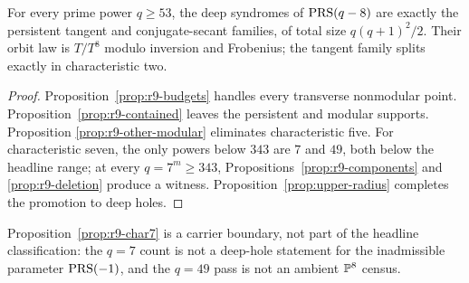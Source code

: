 \begin{theorem}\label{thm:r9}%
%
%
%
%
For every prime power $q\geq53$, the
deep syndromes of $\operatorname{PRS}(q-8)$ are
exactly the persistent tangent and conjugate-secant families, of total
size $q(q+1)^2/2$.  Their orbit law is $T/T^8$ modulo inversion and
Frobenius; the tangent family splits exactly in characteristic two.
\end{theorem}

\begin{proof}
Proposition~\ref{prop:r9-budgets} handles every transverse
nonmodular point.  Proposition~\ref{prop:r9-contained} leaves the
persistent and modular supports.  Proposition
\ref{prop:r9-other-modular} eliminates characteristic five.  For
characteristic seven, the only powers below $343$ are $7$ and $49$,
both below the headline range; at every $q=7^m\geq343$,
Propositions~\ref{prop:r9-components} and \ref{prop:r9-deletion}
  produce a witness.  Proposition~\ref{prop:upper-radius} completes the
  promotion to deep holes.
\end{proof}

Proposition~\ref{prop:r9-char7} is a carrier boundary, not part of the
headline classification: the $q=7$ count is not a deep-hole statement
for the inadmissible parameter $\operatorname{PRS}(-1)$, and the $q=49$ pass is not
an ambient $\mathbb P^8$ census.
